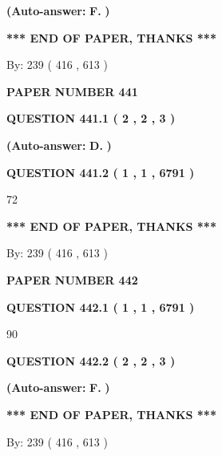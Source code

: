\documentclass[12pt]{article}
\begin{document}
 
{\textbf{(Auto-answer:}}
{\textbf{\large{
F.}}}
{\textbf{)}}
 
 
   
   
   
   
\vspace{1.0in} 
{\textbf{\large{ *** END OF PAPER, THANKS *** }}} 
   
   
\hspace{1.0in} By: 
 239 ( 416 ,  613 )
   
   
   
   
\newpage 
\setcounter{page}{ 
   441001 } 
   
   
 {\textbf{ \Large{ PAPER NUMBER  441  }}}
   
   
   
   
  
  
{\textbf{\large{QUESTION
441.1 
 ( 2 , 2 , 3 )
}}}
 
 
{\textbf{(Auto-answer:}}
{\textbf{\large{
D.}}}
{\textbf{)}}
 
 
  
  
{\textbf{\large{QUESTION
441.2 
 ( 1 , 1 , 6791 )
}}}

72
   
   
   
   
\vspace{1.0in} 
{\textbf{\large{ *** END OF PAPER, THANKS *** }}} 
   
   
\hspace{1.0in} By: 
 239 ( 416 ,  613 )
   
   
   
   
\newpage 
\setcounter{page}{ 
   442001 } 
   
   
 {\textbf{ \Large{ PAPER NUMBER  442  }}}
   
   
   
   
  
  
{\textbf{\large{QUESTION
442.1 
 ( 1 , 1 , 6791 )
}}}

90
  
  
{\textbf{\large{QUESTION
442.2 
 ( 2 , 2 , 3 )
}}}
 
 
{\textbf{(Auto-answer:}}
{\textbf{\large{
F.}}}
{\textbf{)}}
 
 
   
   
   
   
\vspace{1.0in} 
{\textbf{\large{ *** END OF PAPER, THANKS *** }}} 
   
   
\hspace{1.0in} By: 
 239 ( 416 ,  613 )
   
   
   
\end{document}
